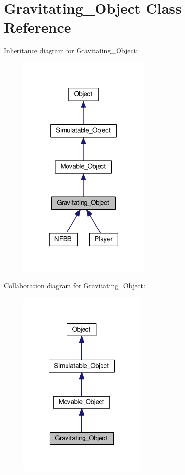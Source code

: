 \hypertarget{classGravitating__Object}{\section{Gravitating\+\_\+\+Object Class Reference}
\label{classGravitating__Object}
}


Inheritance diagram for Gravitating\+\_\+\+Object\+:\nopagebreak
\begin{figure}[H]
\begin{center}
\leavevmode
\includegraphics[width=186pt]{classGravitating__Object__inherit__graph}
\end{center}
\end{figure}


Collaboration diagram for Gravitating\+\_\+\+Object\+:\nopagebreak
\begin{figure}[H]
\begin{center}
\leavevmode
\includegraphics[width=180pt]{classGravitating__Object__coll__graph}
\end{center}
\end{figure}
